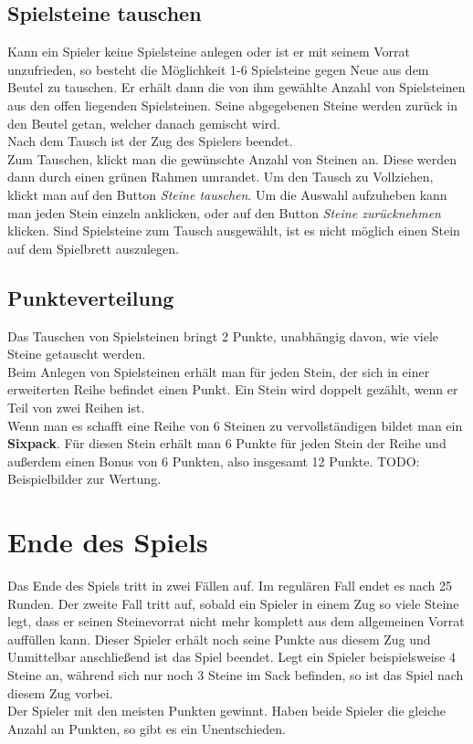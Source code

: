 \documentclass[a4paper, ngerman]{scrartcl}
\begin{document}
\subsection{Spielsteine tauschen}
Kann ein Spieler keine Spielsteine anlegen oder ist er mit seinem Vorrat unzufrieden, so besteht die Möglichkeit 1-6 Spielsteine gegen Neue aus dem Beutel zu tauschen. Er erhält dann die von ihm gewählte Anzahl von Spielsteinen aus den offen liegenden Spielsteinen. Seine abgegebenen Steine werden zurück in den Beutel getan, welcher danach gemischt wird.\\
Nach dem Tausch ist der Zug des Spielers beendet.\\
Zum Tauschen, klickt man die gewünschte Anzahl von Steinen an. Diese werden dann durch einen grünen Rahmen umrandet. Um den Tausch zu Vollziehen, klickt man auf den Button \emph{Steine tauschen}. Um die Auswahl aufzuheben kann man jeden Stein einzeln anklicken, oder auf den Button \emph{Steine zurücknehmen} klicken. Sind Spielsteine zum Tausch ausgewählt, ist es nicht möglich einen Stein auf dem Spielbrett auszulegen.
	
\subsection{Punkteverteilung}
Das Tauschen von Spielsteinen bringt 2 Punkte, unabhängig davon, wie viele Steine getauscht werden.\\
Beim Anlegen von Spielsteinen erhält man für jeden Stein, der sich in einer erweiterten Reihe befindet einen Punkt. Ein Stein wird doppelt gezählt, wenn er Teil von zwei Reihen ist.\\
Wenn man es schafft eine Reihe von 6 Steinen zu vervollständigen bildet man ein \textbf{Sixpack}. Für diesen Stein erhält man 6 Punkte für jeden Stein der Reihe und außerdem einen Bonus von 6 Punkten, also insgesamt 12 Punkte.
TODO: Beispielbilder zur Wertung.
	
\section{Ende des Spiels}
Das Ende des Spiels tritt in zwei Fällen auf. Im regulären Fall endet es nach 25 Runden. Der zweite Fall tritt auf, sobald ein Spieler in einem Zug so viele Steine legt, dass er seinen Steinevorrat nicht mehr komplett aus dem allgemeinen Vorrat auffüllen kann. Dieser Spieler erhält noch seine Punkte aus diesem Zug und Unmittelbar anschließend ist das Spiel beendet. Legt ein Spieler beispielsweise 4 Steine an, während sich nur noch 3 Steine im Sack befinden, so ist das Spiel nach diesem Zug vorbei.\\
Der Spieler mit den meisten Punkten gewinnt. Haben beide Spieler die gleiche Anzahl an Punkten, so gibt es ein Unentschieden.
\end{document}
